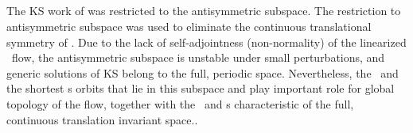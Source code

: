 

\subsection{\Eqva}

The KS work
of 
was restricted to the antisymmetric subspace.
The restriction to antisymmetric subspace was used
to eliminate the continuous translational symmetry of \KSe.
Due to the lack of self-adjointness
(non-normality) of the linearized \KS\ flow, 
the antisymmetric subspace
is unstable under small perturbations, and generic solutions of 
KS belong to the full, periodic space.
Nevertheless, 
the \eqva\ and the shortest \po s orbits that lie in this subspace
and play important role for global topology of the flow,
together
with the \reqva\ and \rpo s
characteristic of the full, continuous translation invariant space..

